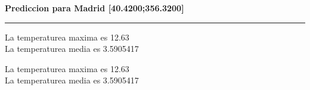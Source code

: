 \documentclass[[a4paper,landscape]{article}\usepackage[]{graphicx}\usepackage[]{color}
\begin{document}










\begin{center}\vspace{-1cm}
\textcolor{meteoblue}{\textbf{ \huge Prediccion para \textcolor{meteoblue}{Madrid [40.4200;356.3200]} }}\\
\date{\today}
\end{center}

\textcolor{meteoblue}{\rule{\linewidth}{1mm}}

\vspace{2cm}

\vspace{2cm}
\begin{example}
La temperaturea maxima es 12.63 \\
La temperaturea media es 3.5905417
\end{example}

\vspace{2cm}
\begin{example}

La temperaturea maxima es 12.63 \\
La temperaturea media es 3.5905417
\end{example}
\end{document}
